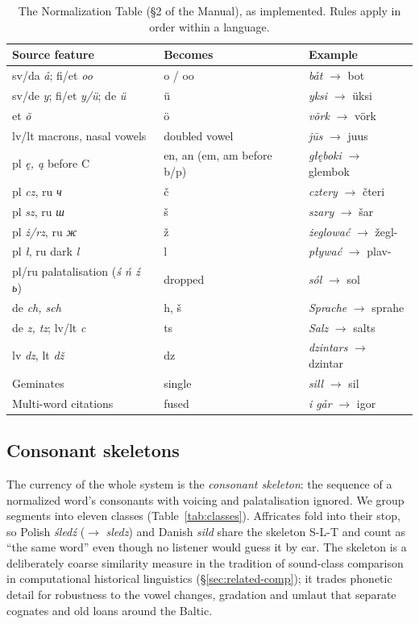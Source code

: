 \begin{table}[t]
\centering\small
\caption{The Normalization Table (\S2 of the Manual), as implemented. Rules apply in order within a language.}
\label{tab:normalization}
\setlength{\tabcolsep}{4pt}
\begin{tabular}{@{}p{3.4cm}p{1.5cm}p{2.5cm}@{}}
\toprule
Source feature & Becomes & Example \\
\midrule
sv/da \emph{å}; fi/et \emph{oo} & o / oo & \emph{båt} $\rightarrow$ bot \\
sv/de \emph{y}; fi/et \emph{y/ü}; de \emph{ü} & ü & \emph{yksi} $\rightarrow$ üksi \\
et \emph{õ} & ö & \emph{võrk} $\rightarrow$ vörk \\
lv/lt macrons, nasal vowels & doubled vowel & \emph{jūs} $\rightarrow$ juus \\
pl \emph{ę, ą} before C & en, an (em, am before b/p) & \emph{głęboki} $\rightarrow$ glembok \\
pl \emph{cz}, ru \emph{ч} & č & \emph{cztery} $\rightarrow$ čteri \\
pl \emph{sz}, ru \emph{ш} & š & \emph{szary} $\rightarrow$ šar \\
pl \emph{ż/rz}, ru \emph{ж} & ž & \emph{żeglować} $\rightarrow$ žegl- \\
pl \emph{ł}, ru dark \emph{l} & l & \emph{pływać} $\rightarrow$ plav- \\
pl/ru palatalisation (\emph{ś ń ź ь}) & dropped & \emph{sól} $\rightarrow$ sol \\
de \emph{ch, sch} & h, š & \emph{Sprache} $\rightarrow$ sprahe \\
de \emph{z, tz}; lv/lt \emph{c} & ts & \emph{Salz} $\rightarrow$ salts \\
lv \emph{dz}, lt \emph{dž} & dz & \emph{dzintars} $\rightarrow$ dzintar \\
Geminates & single & \emph{sill} $\rightarrow$ sil \\
Multi-word citations & fused & \emph{i går} $\rightarrow$ igor \\
\bottomrule
\end{tabular}
\end{table}

\subsection{Consonant skeletons}\label{sec:skeleton}
The currency of the whole system is the \emph{consonant skeleton}: the sequence of a normalized word's consonants with voicing and palatalisation ignored. We group segments into eleven classes (Table~\ref{tab:classes}). Affricates fold into their stop, so Polish \emph{śledź} ($\rightarrow$ \emph{sledz}) and Danish \emph{sild} share the skeleton S-L-T and count as ``the same word'' even though no listener would guess it by ear. The skeleton is a deliberately coarse similarity measure in the tradition of sound-class comparison in computational historical linguistics (\S\ref{sec:related-comp}); it trades phonetic detail for robustness to the vowel changes, gradation and umlaut that separate cognates and old loans around the Baltic.

